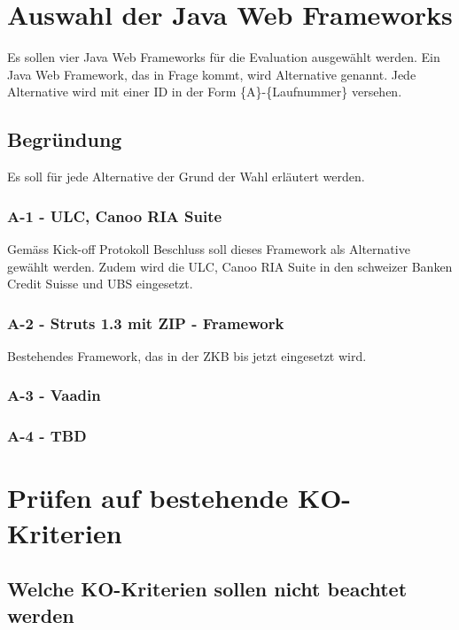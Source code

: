   \section{Auswahl der Java Web Frameworks}
  
  Es sollen vier Java Web Frameworks für die Evaluation ausgewählt werden. Ein
  Java Web Framework, das in Frage kommt, wird Alternative genannt. Jede
  Alternative wird mit einer ID in der Form \{A\}-\{Laufnummer\} versehen.
  
  \subsection{Begründung}
  
  Es soll für jede Alternative der Grund der Wahl erläutert werden.
  
  \subsubsection{A-1 - ULC, Canoo RIA Suite}
  
  Gemäss Kick-off Protokoll Beschluss soll dieses Framework als Alternative
  gewählt werden. Zudem wird die ULC, Canoo RIA Suite in den schweizer Banken
  Credit Suisse und UBS eingesetzt.
  
  \subsubsection{A-2 - Struts 1.3 mit ZIP - Framework}
  
  Bestehendes Framework, das in der ZKB bis jetzt eingesetzt wird.
  
  \subsubsection{A-3 - Vaadin}
  
  \subsubsection{A-4 - TBD}  
  
  \section{Prüfen auf bestehende KO-Kriterien}
  
  \subsection{Welche KO-Kriterien sollen nicht beachtet werden}
  
